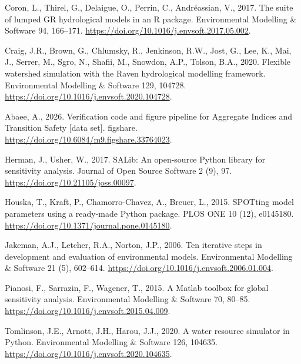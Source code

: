 \documentclass[11pt]{article}
\begin{document}
\begin{thebibliography}{}
Coron, L., Thirel, G., Delaigue, O., Perrin, C., Andr\'eassian, V., 2017.
The suite of lumped GR hydrological models in an R package. Environmental
Modelling \& Software 94, 166--171.
\url{https://doi.org/10.1016/j.envsoft.2017.05.002}.

Craig, J.R., Brown, G., Chlumsky, R., Jenkinson, R.W., Jost, G., Lee, K.,
 Mai, J., Serrer, M., Sgro, N., Shafii, M., Snowdon, A.P., Tolson, B.A.,
 2020. Flexible watershed simulation with the Raven hydrological modelling
 framework. Environmental Modelling \& Software 129, 104728.
 \url{https://doi.org/10.1016/j.envsoft.2020.104728}.

Abaee, A., 2026. Verification code and figure pipeline for Aggregate
Indices and Transition Safety [data set]. figshare.
\url{https://doi.org/10.6084/m9.figshare.33764023}.

Herman, J., Usher, W., 2017. SALib: An open-source Python library for
sensitivity analysis. Journal of Open Source Software 2 (9), 97.
\url{https://doi.org/10.21105/joss.00097}.

Houska, T., Kraft, P., Chamorro-Chavez, A., Breuer, L., 2015. SPOTting
model parameters using a ready-made Python package. PLOS ONE 10 (12),
e0145180. \url{https://doi.org/10.1371/journal.pone.0145180}.

Jakeman, A.J., Letcher, R.A., Norton, J.P., 2006. Ten iterative steps in
development and evaluation of environmental models. Environmental Modelling
\& Software 21 (5), 602--614. \url{https://doi.org/10.1016/j.envsoft.2006.01.004}.

Pianosi, F., Sarrazin, F., Wagener, T., 2015. A Matlab toolbox for global
sensitivity analysis. Environmental Modelling \& Software 70, 80--85.
\url{https://doi.org/10.1016/j.envsoft.2015.04.009}.

Tomlinson, J.E., Arnott, J.H., Harou, J.J., 2020. A water resource
simulator in Python. Environmental Modelling \& Software 126, 104635.
\url{https://doi.org/10.1016/j.envsoft.2020.104635}.

\end{thebibliography}
\end{document}
